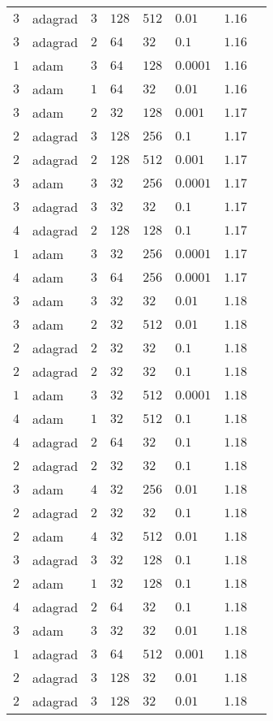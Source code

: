 \begin{table}[hb]
\begin{tabular}{llllllll}
    $3$ & adagrad & $3$ & $128$ & $512$ & $0.01$ & $1.16$ \\
    $3$ & adagrad & $2$ & $64$ & $32$ & $0.1$ & $1.16$ \\
    $1$ & adam & $3$ & $64$ & $128$ & $0.0001$ & $1.16$ \\
    $3$ & adam & $1$ & $64$ & $32$ & $0.01$ & $1.16$ \\
    $3$ & adam & $2$ & $32$ & $128$ & $0.001$ & $1.17$ \\
    $2$ & adagrad & $3$ & $128$ & $256$ & $0.1$ & $1.17$ \\
    $2$ & adagrad & $2$ & $128$ & $512$ & $0.001$ & $1.17$ \\
    $3$ & adam & $3$ & $32$ & $256$ & $0.0001$ & $1.17$ \\
    $3$ & adagrad & $3$ & $32$ & $32$ & $0.1$ & $1.17$ \\
    $4$ & adagrad & $2$ & $128$ & $128$ & $0.1$ & $1.17$ \\
    $1$ & adam & $3$ & $32$ & $256$ & $0.0001$ & $1.17$ \\
    $4$ & adam & $3$ & $64$ & $256$ & $0.0001$ & $1.17$ \\
    $3$ & adam & $3$ & $32$ & $32$ & $0.01$ & $1.18$ \\
    $3$ & adam & $2$ & $32$ & $512$ & $0.01$ & $1.18$ \\
    $2$ & adagrad & $2$ & $32$ & $32$ & $0.1$ & $1.18$ \\
    $2$ & adagrad & $2$ & $32$ & $32$ & $0.1$ & $1.18$ \\
    $1$ & adam & $3$ & $32$ & $512$ & $0.0001$ & $1.18$ \\
    $4$ & adam & $1$ & $32$ & $512$ & $0.1$ & $1.18$ \\
    $4$ & adagrad & $2$ & $64$ & $32$ & $0.1$ & $1.18$ \\
    $2$ & adagrad & $2$ & $32$ & $32$ & $0.1$ & $1.18$ \\
    $3$ & adam & $4$ & $32$ & $256$ & $0.01$ & $1.18$ \\
    $2$ & adagrad & $2$ & $32$ & $32$ & $0.1$ & $1.18$ \\
    $2$ & adam & $4$ & $32$ & $512$ & $0.01$ & $1.18$ \\
    $3$ & adagrad & $3$ & $32$ & $128$ & $0.1$ & $1.18$ \\
    $2$ & adam & $1$ & $32$ & $128$ & $0.1$ & $1.18$ \\
    $4$ & adagrad & $2$ & $64$ & $32$ & $0.1$ & $1.18$ \\
    $3$ & adam & $3$ & $32$ & $32$ & $0.01$ & $1.18$ \\
    $1$ & adagrad & $3$ & $64$ & $512$ & $0.001$ & $1.18$ \\
    $2$ & adagrad & $3$ & $128$ & $32$ & $0.01$ & $1.18$ \\
    $2$ & adagrad & $3$ & $128$ & $32$ & $0.01$ & $1.18$ \\
    \bottomrule
    \end{tabular}
\end{table}